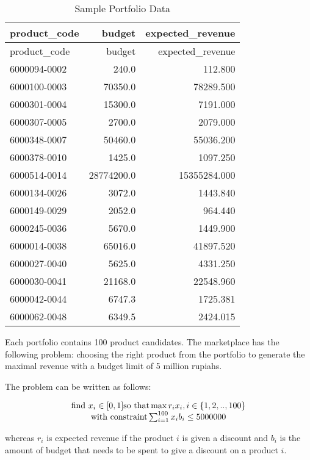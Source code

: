 \documentclass[
]{article}
\begin{document}
\begin{longtable}[]{@{}lrr@{}}
\caption{Sample Portfolio Data}\tabularnewline
\toprule()
product\_code & budget & expected\_revenue \\
\midrule()
\endfirsthead
\toprule()
product\_code & budget & expected\_revenue \\
\midrule()
\endhead
6000094-0002 & 240.0 & 112.800 \\
6000100-0003 & 70350.0 & 78289.500 \\
6000301-0004 & 15300.0 & 7191.000 \\
6000307-0005 & 2700.0 & 2079.000 \\
6000348-0007 & 50460.0 & 55036.200 \\
6000378-0010 & 1425.0 & 1097.250 \\
6000514-0014 & 28774200.0 & 15355284.000 \\
6000134-0026 & 3072.0 & 1443.840 \\
6000149-0029 & 2052.0 & 964.440 \\
6000245-0036 & 5670.0 & 1449.900 \\
6000014-0038 & 65016.0 & 41897.520 \\
6000027-0040 & 5625.0 & 4331.250 \\
6000030-0041 & 21168.0 & 22548.960 \\
6000042-0044 & 6747.3 & 1725.381 \\
6000062-0048 & 6349.5 & 2424.015 \\
\bottomrule()
\end{longtable}

Each portfolio contains 100 product candidates. The marketplace has the
following problem: choosing the right product from the portfolio to
generate the maximal revenue with a budget limit of 5 million rupiahs.

The problem can be written as follows:

\begin{align}
\begin{matrix} 
\text{find }x_i \in [0,1] \space \text{so that} \space \max{r_i x_i}, \space i \in \{1,2,..,100\} \\
\text{with constraint} \space \sum_{i = 1}^{100}x_i b_i \leq 5000000
\end{matrix} 
\end{align}

whereas \(r_i\) is expected revenue if the product \(i\) is given a
discount and \(b_i\) is the amount of budget that needs to be spent to
give a discount on a product \(i\).
\end{document}
